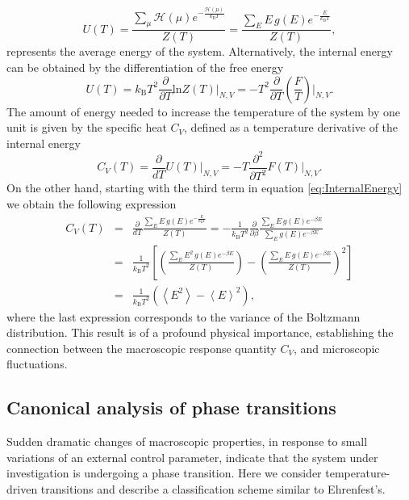 \documentclass[12pt]{report}
\begin{document}
\begin{equation}
\label{eq:InternalEnergy}
U(T) = \frac{\sum_{\mu} \mathcal{H}(\mu)e^{-\frac{\mathcal{H}(\mu)}{k_{\mathrm{B}}T}}}{Z(T)} =  \frac{\sum_{E} E \, g(E) e^{-\frac{E}{k_{\mathrm{B}}T}}}{Z(T)},
\end{equation}
represents the average energy of the system. Alternatively, the internal energy can be obtained by the differentiation of the free energy
\begin{equation}
U(T) = k_{\mathrm{B}}T^{2}\frac{\partial}{\partial T} \mathrm{ln} Z(T)\bigg|_{N,V}
= -T^{2}\frac{\partial}{\partial T}\left(\frac{F}{T}\right)\bigg|_{N,V}.
\end{equation}
\newpage
\noindent
The amount of energy needed to increase the temperature of the system by one unit is given by the specific heat 
$C_{V}$, defined as a temperature derivative of the internal energy
\begin{equation}\label{eq:22}
C_{V}(T) = \frac{\partial}{dT}U(T)\bigg|_{N,V} = -T\frac{\partial^{2}}{\partial T^{2}}F(T)\bigg|_{N,V}.
\end{equation}
On the other hand, starting with the third term in equation \ref{eq:InternalEnergy} we obtain the following expression 
\begin{eqnarray}
C_{V}(T) &=&  \frac{\partial}{dT}\frac{\sum_{E} E \, g(E) e^{-\frac{E}{k_{\mathrm{B}}T}}}{Z(T)} = -\frac{1}{k_{\mathrm{B}}T^2}\frac{\partial}{\partial \beta}\frac{\sum_{E} E \, g(E) e^{-\beta E}}{\sum_{E}g(E) e^{-\beta E}} \nonumber \\
&=& \frac{1}{k_{\mathrm{B}}T^2} \left[\left(\frac{\sum_{E} E^{2} \, g(E)  e^{-\beta E}}{Z(T)}\right) - \left(\frac{\sum_{E} E \, g(E)  e^{-\beta E}}{Z(T)}\right)^{2}\right] \nonumber \\
&=& \frac{1}{k_{\mathrm{B}}T^2}\left(\left<E^{2}\right> - \left<E\right>^{2}\right),
\end{eqnarray}
where the last expression corresponds to the variance of the Boltzmann distribution. This result is of a profound physical importance, establishing the connection between the macroscopic response quantity $C_{V}$, and microscopic fluctuations.

\subsection{Canonical analysis of phase transitions}
Sudden dramatic changes of macroscopic properties, in response to small variations of an external control parameter, indicate that the system under investigation is undergoing a phase transition. Here we consider temperature-driven transitions and describe a classification scheme similar to Ehrenfest's.
\end{document}
